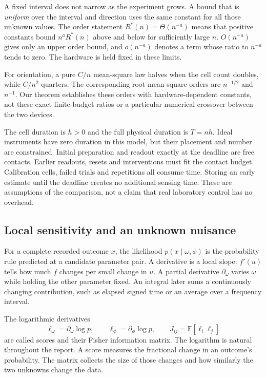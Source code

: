 \documentclass[11pt,a4paper]{article}
\numberwithin{equation}{section}
\theoremstyle{remark}
\newcommand{\E}{\mathbb E}
\begin{document}
A fixed interval does not narrow as the experiment grows. A bound that is
\emph{uniform} over the interval and direction uses the same constant for
all those unknown values. The order statement $R^*(n)=\Theta(n^{-a})$
means that positive constants bound $n^aR^*(n)$ above and below for
sufficiently large $n$. $O(n^{-a})$ gives only an upper order bound, and
$o(n^{-a})$ denotes a term whose ratio to $n^{-a}$ tends to zero.
The hardware is held fixed in these limits.

For orientation, a pure $C/n$ mean-square law halves when the cell count
doubles, while $C/n^2$ quarters. The corresponding root-mean-square orders
are $n^{-1/2}$ and $n^{-1}$. Our theorem establishes these orders with
hardware-dependent constants, not these exact finite-budget ratios or a
particular numerical crossover between the two devices.

The cell duration is $h>0$ and the full physical duration is $T=nh$.
Ideal instruments have zero duration in this model, but their placement and
number are constrained. Initial preparation and readout exactly at the
deadline are free contacts. Earlier readouts, resets and interventions must
fit the contact budget. Calibration cells, failed trials and repetitions
all consume time. Storing an early estimate until the deadline creates no
additional sensing time. These are assumptions of the comparison, not a
claim that real laboratory control has no overhead.

\subsection{Local sensitivity and an unknown nuisance}

For a complete recorded outcome $x$, the likelihood $p(x\mid\omega,\phi)$
is the probability rule predicted at a candidate parameter pair.
A derivative is a local slope: $f'(u)$ tells how much $f$ changes per small
change in $u$. A partial derivative $\partial_\omega$ varies $\omega$
while holding the other parameter fixed. An integral later sums a continuously
changing contribution, such as elapsed signed time or an average over a
frequency interval.

The logarithmic derivatives
\begin{equation}
 \ell_\omega=\partial_\omega\log p,\qquad
 \ell_\phi=\partial_\phi\log p,\qquad
 J_{ij}=\E[\ell_i\ell_j]
 \label{intro:scores}
\end{equation}
are called scores and their Fisher information matrix. The logarithm is
natural throughout the report. A score measures the fractional change in an
outcome's probability. The matrix collects the size of those changes and
how similarly the two unknowns change the data.
\end{document}
